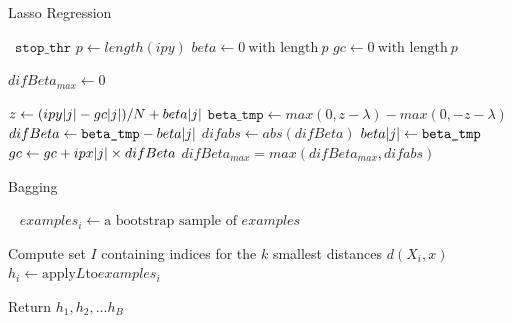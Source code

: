 \documentclass[a4paper]{article}
\begin{document}
 \begin{algorithm}
 
   \caption{Lasso Regression }
    \begin{algorithmic}[1]
      \
      \State $\texttt{stop\_thr}$ 
      \State $p \leftarrow length(ipy)$
      \State $beta \leftarrow 0 \ \text{with length} \ p$
\State $gc \leftarrow 0 \ \text{with length} \ p$
 
 \State $difBeta_{max} \leftarrow  0 $
 
 \State $z \leftarrow (ipy\abs{j} - gc\abs{j})/N +beta\abs{j}$
 \State $\texttt{beta\_tmp} \leftarrow max(0,z-\lambda)- max(0,-z-\lambda) $
 \State $difBeta \leftarrow \texttt{beta\_tmp}  - beta\abs{j}$
 \State $difabs \leftarrow abs(difBeta)$
  \State $beta\abs{j} \leftarrow \texttt{beta\_tmp} $ 
  \State $gc \leftarrow gc + ipx\abs{j} \times difBeta$
  \State $difBeta_{max} = max(difBeta_{max},difabs)$
  \EndIf
 \EndFor
\EndWhile


 \EndFunction

\end{algorithmic}
\end{algorithm}


  \begin{algorithm}
 
   \caption{Bagging ~\cite{bagging1
   } }
    \begin{algorithmic}[1]
      \
            \State $examples_{i} \leftarrow \text{a bootstrap sample of }  examples$
        \EndFor
        
         \State Compute set $I$ containing indices for the $k$ smallest distances $d{(X_i,x)}$
         \State $h_i  \leftarrow \text{apply} L \text{to} examples_{i}$
     
       \State Return $h_{1},h_{2},...h_{B}$



 \EndFunction
 
 \end{algorithmic}
\end{algorithm}
\end{document}
